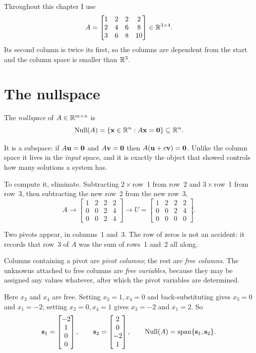 Throughout this chapter I use
\[
	A=\begin{bmatrix}
		1&2&2&2\\
		2&4&6&8\\
		3&6&8&10
	\end{bmatrix}\in\mathbb{R}^{3\times4}.
\]
Its second column is twice its first, so the columns are dependent from the
start and the column space is smaller than \(\mathbb{R}^{3}\).

\section{The nullspace}

\begin{definition}
The \emph{nullspace} of \(A\in\mathbb{R}^{m\times n}\) is
\[
	\operatorname{Null}(A)=\{\mathbf{x}\in\mathbb{R}^{n}: A\mathbf{x}=\mathbf{0}\}\subseteq\mathbb{R}^{n}.
\]
\end{definition}

It is a subspace: if \(A\mathbf{u}=\mathbf{0}\) and \(A\mathbf{v}=\mathbf{0}\) then
\(A(\mathbf{u}+c\mathbf{v})=\mathbf{0}\). Unlike the column space it lives in the
\emph{input} space, and it is exactly the object that 
showed controls how many solutions a system has.

To compute it, eliminate. Subtracting \(2\times\)row~1 from row~2 and
\(3\times\)row~1 from row~3, then subtracting the new row~2 from the new row~3,
\[
	A\longrightarrow
	\begin{bmatrix}1&2&2&2\\0&0&2&4\\0&0&2&4\end{bmatrix}
	\longrightarrow
	U=\begin{bmatrix}1&2&2&2\\0&0&2&4\\0&0&0&0\end{bmatrix}.
\]

Two pivots appear, in columns~1 and~3. The row of zeros is not an accident: it
records that row~3 of \(A\) was the sum of rows~1 and~2 all along.

\begin{definition}
Columns containing a pivot are \emph{pivot columns}; the rest are \emph{free
columns}. The unknowns attached to free columns are \emph{free variables},
because they may be assigned any values whatever, after which the pivot
variables are determined.
\end{definition}

Here \(x_2\) and \(x_4\) are free. Setting \(x_2=1,x_4=0\) and back-substituting
gives \(x_3=0\) and \(x_1=-2\); setting \(x_2=0,x_4=1\) gives \(x_3=-2\) and
\(x_1=2\). So
\[
	\mathbf{s}_1=\begin{bmatrix}-2\\1\\0\\0\end{bmatrix},
	\qquad
	\mathbf{s}_2=\begin{bmatrix}2\\0\\-2\\1\end{bmatrix},
	\qquad
	\operatorname{Null}(A)=\operatorname{span}\{\mathbf{s}_1,\mathbf{s}_2\}.
\]

